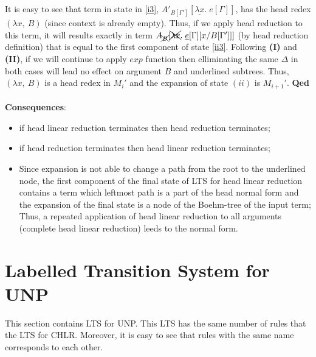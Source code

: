 \documentclass[a4paper, 10pt]{article}
\begin{document}
It is easy to see that term in state in \eqref{i3}, $A'_{B[\Gamma']}[\underline{\lambda x}.\; e[\Gamma]]$, has the head redex $(\lambda x,\ B)$ (since context is already empty). Thus, if we apply head reduction to this term, it will results exactly in term $A_{\xcancel{B}}[\xcancel{\lambda x}.\; \underline{e}[\Gamma][x/B[\Gamma']]]$ (by head reduction definition) that is equal to the first component of state \eqref{ii3}. Following \textbf{(I)} and \textbf{(II)}, if we will continue to apply $exp$ function then elliminating the same $\Delta$ in both cases will lead no effect on argument $B$ and underlined subtrees. Thus, $(\lambda x,\ B)$ is a head redex in $M_i'$ and the expansion of state $(ii)$ is $M_{i+1}'$. \hfill{\textbf{Qed}} \\ \\ 

\textbf{Consequences}:
\begin{itemize}
\item if head linear reduction terminates then head reduction terminates;
\item if head reduction terminates then head linear reduction terminates;
\item Since expansion is not able to change a path from the root to the underlined node,
  the first component of the final state of LTS for head linear reduction
  contains a term which leftmost path is a part of the head normal form 
  and the expansion of the final state is a node of the Boehm-tree of the input term; \\
  Thus, a repeated application of head linear reduction to all arguments
  (complete head linear reduction) leeds to the normal form.
\end{itemize}



\section{Labelled Transition System for UNP}
This section contains LTS for UNP. This LTS has the same number of rules that the LTS for CHLR.
Moreover, it is easy to see that rules with the same name corresponds to each other. \\ \\
\end{document}
